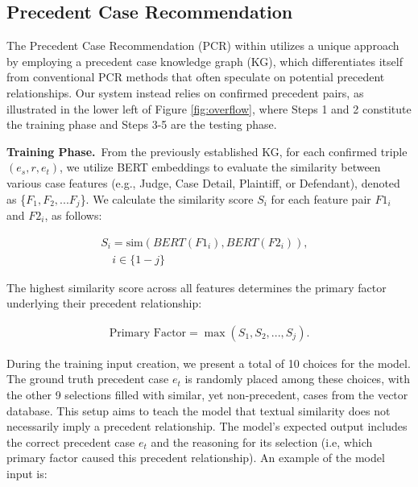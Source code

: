 \subsection{Precedent Case Recommendation}

The Precedent Case Recommendation (PCR) within \sysname utilizes a unique approach by employing a precedent case knowledge graph (KG), which differentiates itself from conventional PCR methods that often speculate on potential precedent relationships. Our system instead relies on confirmed precedent pairs, as illustrated in the lower left of Figure \ref{fig:overflow}, where Steps 1 and 2 constitute the training phase and Steps 3-5 are the testing phase.

\vspace{3pt}\noindent\textbf{Training Phase.}\, From the previously established KG, for each confirmed triple $(e_s, r, e_t)$, we utilize BERT embeddings \cite{devlin2018bert} to evaluate the similarity between various case features (e.g., Judge, Case Detail, Plaintiff, or Defendant), denoted as \{\( F_1, F_2, ... F_j\)\}. We calculate the similarity score \( S_i \) for each feature pair \( F1_i \) and \( F2_i \), as follows:

\begin{equation}
\label{eq:1}
\begin{aligned}
S_{i} = \text{sim}(BERT(F1_{i}), BERT(F2_{i})), &\\ \quad i \in \{1-j\}
\end{aligned}
\end{equation}

The highest similarity score across all features determines the primary factor underlying their precedent relationship:

\begin{equation}
\label{eq:2}
\begin{aligned}
\text{Primary Factor} = \max(S_{1}, S_{2}, ..., S_{j}).
\end{aligned}
\end{equation}

During the training input creation, we present a total of 10 choices for the model. The ground truth precedent case $e_t$ is randomly placed among these choices, with the other 9 selections filled with similar, yet non-precedent, cases from the vector database. This setup aims to teach the model that textual similarity does not necessarily imply a precedent relationship. The model's expected output includes the correct precedent case $e_t$ and the reasoning for its selection (i.e, which primary factor caused this precedent relationship). An example of the model input is:

